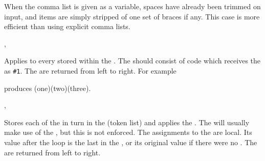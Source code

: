 \documentclass[oneside]{book}
\begin{document}
When the comma list is given as a variable, spaces
have already been trimmed on input, and items are simply stripped
of one set of braces if any. This case is more efficient than using
explicit comma lists.


\begin{function}{\ClistMapInline,\ClistVarMapInline}
\begin{syntax}
  
  
\end{syntax}
Applies  to every  stored
within the . The  should
consist of code which receives the  as \verb|#1|.
The  are returned from left to right.
For example
\begin{codehigh}
\IgnoreSpacesOn
\TlClear \lTmpaTl
{} {
  \TlPutRight {}
}
\Result {\TlUse\lTmpaTl}
\IgnoreSpacesOff
\end{codehigh}
produces (one)(two)(three).
\end{function}

\begin{function}{\ClistMapVariable,\ClistVarMapVariable}
\begin{syntax}
   
   
\end{syntax}
Stores each  of the  in turn in the
(token list)  and applies the .  The
 will usually make use of the , but this
is not enforced.  The assignments to the  are local.
Its value after the loop is the last  in the , or its original value if there were no .  The
 are returned from left to right.
\begin{demohigh}
\IgnoreSpacesOn
{} \lTmpiTl {
  \TlPutRight \gTmpaTl {\Expand {(\lTmpiTl)}}
}
\TlUse \gTmpaTl
\IgnoreSpacesOff
\end{demohigh}
\end{function}
 
\end{document}
